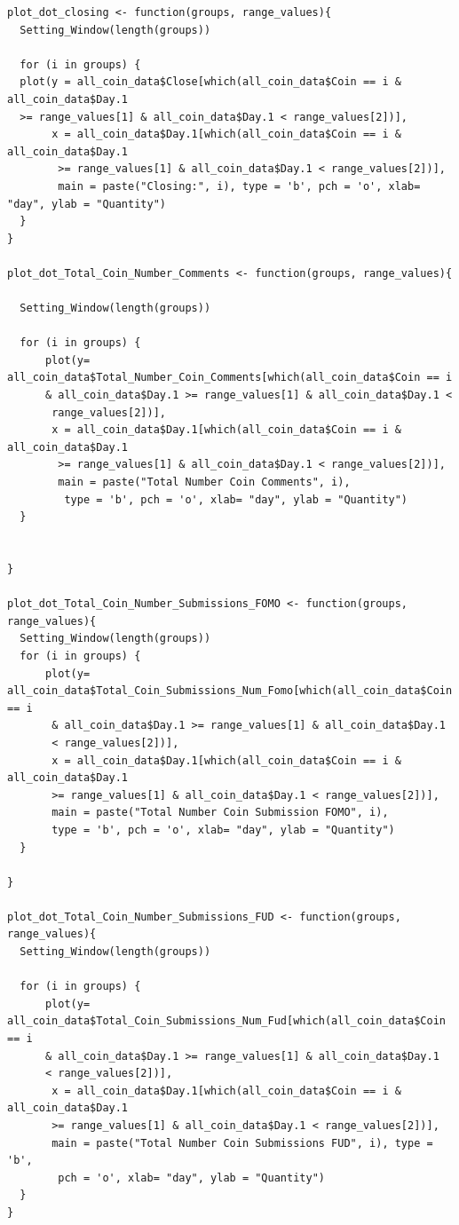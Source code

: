 \documentclass[12pt]{article}
\begin{document}
{\begin{verbatim}
plot_dot_closing <- function(groups, range_values){
  Setting_Window(length(groups))
  
  for (i in groups) {
  plot(y = all_coin_data$Close[which(all_coin_data$Coin == i & all_coin_data$Day.1 
  >= range_values[1] & all_coin_data$Day.1 < range_values[2])], 
       x = all_coin_data$Day.1[which(all_coin_data$Coin == i & all_coin_data$Day.1
        >= range_values[1] & all_coin_data$Day.1 < range_values[2])], 
        main = paste("Closing:", i), type = 'b', pch = 'o', xlab= "day", ylab = "Quantity")
  }
}

plot_dot_Total_Coin_Number_Comments <- function(groups, range_values){

  Setting_Window(length(groups))
  
  for (i in groups) {
      plot(y= all_coin_data$Total_Number_Coin_Comments[which(all_coin_data$Coin == i 
      & all_coin_data$Day.1 >= range_values[1] & all_coin_data$Day.1 <
       range_values[2])], 
       x = all_coin_data$Day.1[which(all_coin_data$Coin == i & all_coin_data$Day.1
        >= range_values[1] & all_coin_data$Day.1 < range_values[2])], 
        main = paste("Total Number Coin Comments", i),
         type = 'b', pch = 'o', xlab= "day", ylab = "Quantity")
  }

  
}

plot_dot_Total_Coin_Number_Submissions_FOMO <- function(groups, range_values){
  Setting_Window(length(groups))
  for (i in groups) {
      plot(y= all_coin_data$Total_Coin_Submissions_Num_Fomo[which(all_coin_data$Coin == i
       & all_coin_data$Day.1 >= range_values[1] & all_coin_data$Day.1 
       < range_values[2])], 
       x = all_coin_data$Day.1[which(all_coin_data$Coin == i & all_coin_data$Day.1 
       >= range_values[1] & all_coin_data$Day.1 < range_values[2])], 
       main = paste("Total Number Coin Submission FOMO", i), 
       type = 'b', pch = 'o', xlab= "day", ylab = "Quantity")
  }
  
}

plot_dot_Total_Coin_Number_Submissions_FUD <- function(groups, range_values){
  Setting_Window(length(groups))
    
  for (i in groups) {
      plot(y= all_coin_data$Total_Coin_Submissions_Num_Fud[which(all_coin_data$Coin == i 
      & all_coin_data$Day.1 >= range_values[1] & all_coin_data$Day.1 
      < range_values[2])], 
       x = all_coin_data$Day.1[which(all_coin_data$Coin == i & all_coin_data$Day.1 
       >= range_values[1] & all_coin_data$Day.1 < range_values[2])], 
       main = paste("Total Number Coin Submissions FUD", i), type = 'b',
        pch = 'o', xlab= "day", ylab = "Quantity")
  }
}


\end{verbatim}}
\end{document}
